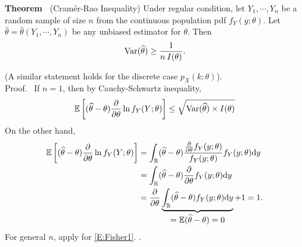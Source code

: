  \begin{frame}

 {\bf Theorem~} (Cram\'er-Rao Inequality)
 Under regular condition, let $Y_1,\cdots,Y_n$ be a random sample of size $n$ from the continuous population pdf $f_Y(y;\theta)$.
Let $\widehat{\theta}=\widehat{\theta}(Y_1,\cdots,Y_n)$ be any unbiased estimator for $\theta$. Then
\[
\text{Var}(\widehat{\theta})\ge \frac{1}{n\:I(\theta)}.
\]

 (A similar statement holds for the  discrete case $p_X(k;\theta)$).\\[1em]

 \pause
 {Proof.~}
If $n=1$, then by Cauchy-Schwartz inequality,
 \begin{align*}
 \mathbb{E}\left[(\widehat{\theta}-\theta) \frac{\partial}{\partial \theta}\ln f_Y(Y;\theta)\right]
 \le \sqrt{\text{Var}(\widehat{\theta})\times I(\theta)}
 \end{align*}
On the other hand,
\begin{align*}
\mathbb{E}\left[(\widehat{\theta}-\theta) \frac{\partial}{\partial \theta}\ln f_Y(Y;\theta)\right] &= \int_{\mathbb{R}} (\widehat{\theta}-\theta) \frac{\frac{\partial}{\partial \theta} f_Y(y;\theta)}{f_Y(y;\theta)} f_Y(y;\theta)\mathrm{d} y\\
&= \int_{\mathbb{R}} (\widehat{\theta}-\theta) \frac{\partial}{\partial \theta} f_Y(y;\theta)\mathrm{d} y \\
& =\frac{\partial}{\partial \theta} \underbrace{\int_{\mathbb{R}} (\widehat{\theta}-\theta)  f_Y(y;\theta)\mathrm{d} y}_{\displaystyle=\mathbb{E}(\widehat{\theta}-\theta)=0}+1=1.
\end{align*}
For general $n$, apply for \eqref{E:Fisher1}. \myEnd.
\end{frame}
